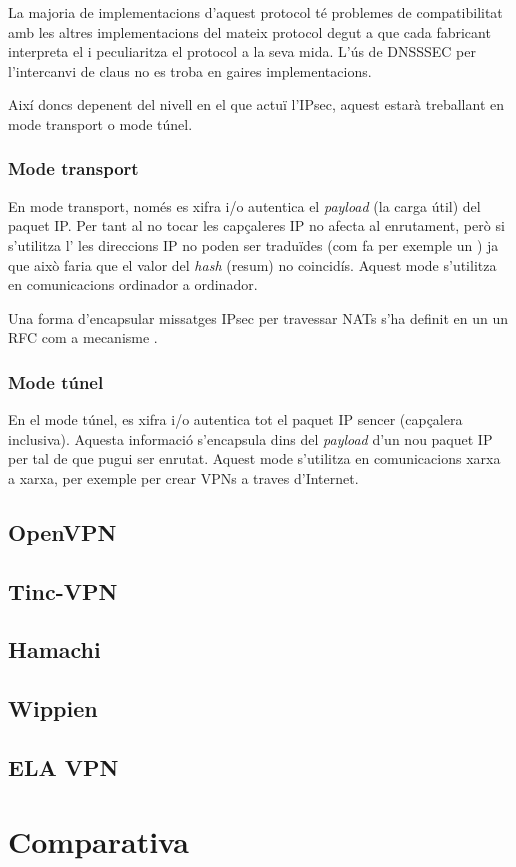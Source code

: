 La majoria de implementacions d'aquest protocol té problemes de compatibilitat amb les altres implementacions del mateix protocol degut a que cada fabricant interpreta el  i peculiaritza el protocol a la seva mida. L'ús de DNSSSEC per l'intercanvi de claus no es troba en gaires implementacions.

Així doncs depenent del nivell en el que actuï l'IPsec, aquest estarà treballant en mode transport o mode túnel.
\subsubsection{Mode transport}
En mode transport, només es xifra i/o autentica el \emph{payload} (la carga útil) del paquet IP. Per tant al no tocar les capçaleres IP no afecta al enrutament, però si s'utilitza l' les direccions IP no poden ser traduïdes (com fa per exemple un ) ja que això faria que el valor del \emph{hash} (resum) no coincidís. Aquest mode s'utilitza en comunicacions ordinador a ordinador.

Una forma d'encapsular missatges IPsec per travessar NATs s'ha definit en un un RFC com a mecanisme .
\subsubsection{Mode túnel}
En el mode túnel, es xifra i/o autentica tot el paquet IP sencer (capçalera inclusiva). Aquesta informació s'encapsula dins del \emph{payload} d'un nou paquet IP per tal de que pugui ser enrutat. Aquest mode s'utilitza en comunicacions xarxa a xarxa, per exemple per crear VPNs a traves d'Internet.

\subsection{OpenVPN}
\subsection{Tinc-VPN}
\subsection{Hamachi}
\subsection{Wippien}
\subsection{ELA VPN}
\section{Comparativa}
